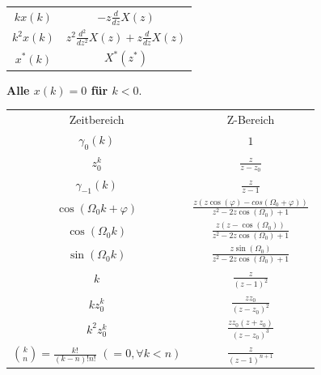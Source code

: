 \documentclass[10pt,a4paper]{article}
\begin{document}
\begin{minipage}{0.5\textwidth}
\begin{center}
\begin{tabular}{ | c | c | }
  \cline{1-2}
          $kx(k)$ & $-z\frac{d}{dz}X(z)$ \\  

  \cline{1-2}
          $k^{2}x(k)$ & $z^{2}\frac{d^2}{dz^2}X(z)+z\frac{d}{dz}X(z)$ \\
  
  \cline{1-2}
          $x^*(k)$ & $X^*(z^*)$ \\
  \cline{1-2}
  \end{tabular}
  \egroup
\end{center}
\end{minipage}

\textbf{Alle $x(k)=0$ für $k < 0$}.
\begin{center}
  \bgroup
  \def\arraystretch{1.5}
  \begin{tabular}{ | c | c | }
  \cline{1-2}
          \rowcolor{black!15}
          Zeitbereich & Z-Bereich \\
  
  \cline{1-2}
          $\gamma_0(k)$ &
          $1$ \\

  \cline{1-2}
          $z_0^k$ & $\frac{z}{z-z_0}$ \\

  \cline{1-2}
          $\gamma_{-1}(k)$ & $\frac{z}{z-1}$\\

  \cline{1-2}
        $\cos(\Omega_0k+\varphi)$ & $\frac{z(z\cos(\varphi)-cos(\Omega_0+\varphi))}{z^2-2z\cos(\Omega_0)+1}$ \\ 

  \cline{1-2}
          $\cos(\Omega_0k)$ & $\frac{z(z-\cos(\Omega_0))}{z^2-2z\cos(\Omega_0)+1}$ \\ 
  
  \cline{1-2}
          $\sin(\Omega_0k)$ & $\frac{z\sin(\Omega_0)}{z^2-2z\cos(\Omega_0)+1}$ \\  
  
  \cline{1-2}
          $k$ & $\frac{z}{(z-1)^2}$ \\ 

  \cline{1-2}
          $kz_0^k$ & $\frac{zz_0}{(z-z_0)^2}$\\ 

  \cline{1-2}
          $k^2z_0^k$ & $\frac{zz_0(z+z_0)}{(z-z_0)^3}$ \\  

  \cline{1-2}
          \shortstack{$\binom{k}{n}=\frac{k!}{(k-n)!n!}$ \\ $(=0, \forall{}k<n)$} & $\frac{z}{(z-1)^{n+1}}$ \\
  
  \cline{1-2}
  \end{tabular}
  \egroup
\end{center}
 \newpage
\end{document}
